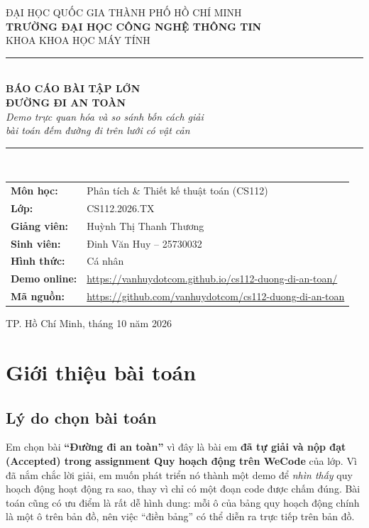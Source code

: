\documentclass[12pt,a4paper]{report}
\newcommand{\demo}{\url{https://vanhuydotcom.github.io/cs112-duong-di-an-toan/}}
\begin{document}
\begin{titlepage}
\centering
\vspace*{0.4cm}
{\large ĐẠI HỌC QUỐC GIA THÀNH PHỐ HỒ CHÍ MINH}\\[4pt]
{\large\bfseries TRƯỜNG ĐẠI HỌC CÔNG NGHỆ THÔNG TIN}\\[4pt]
{\large KHOA KHOA HỌC MÁY TÍNH}\\[1.2cm]
\rule{\linewidth}{1pt}\\[10pt]
{\Large\bfseries\color{dnavy} BÁO CÁO BÀI TẬP LỚN}\\[14pt]
{\LARGE\bfseries ĐƯỜNG ĐI AN TOÀN}\\[10pt]
{\large\itshape Demo trực quan hóa và so sánh bốn cách giải\\bài toán đếm đường đi trên lưới có vật cản}\\[10pt]
\rule{\linewidth}{1pt}\\[1.4cm]
\begin{tabular}{@{}>{\bfseries}l l@{}}
Môn học: & Phân tích \& Thiết kế thuật toán (CS112) \\[6pt]
Lớp: & CS112.2026.TX \\[6pt]
Giảng viên: & Huỳnh Thị Thanh Thương \\[6pt]
Sinh viên: & Đinh Văn Huy -- 25730032 \\[6pt]
Hình thức: & Cá nhân \\[6pt]
Demo online: & \demo \\[6pt]
Mã nguồn: & \url{https://github.com/vanhuydotcom/cs112-duong-di-an-toan}\\
\end{tabular}
\vfill
{\large TP. Hồ Chí Minh, tháng 10 năm 2026}
\end{titlepage}

\tableofcontents

\chapter{Giới thiệu bài toán}
\section{Lý do chọn bài toán}
Em chọn bài \textbf{``Đường đi an toàn''} vì đây là bài em \textbf{đã tự giải và nộp đạt (Accepted) trong assignment Quy hoạch động trên WeCode} của lớp. Vì đã nắm chắc lời giải, em muốn phát triển nó thành một demo để \emph{nhìn thấy} quy hoạch động hoạt động ra sao, thay vì chỉ có một đoạn code được chấm đúng. Bài toán cũng có ưu điểm là rất dễ hình dung: mỗi ô của bảng quy hoạch động chính là một ô trên bản đồ, nên việc ``điền bảng'' có thể diễn ra trực tiếp trên bản đồ.
\end{document}
